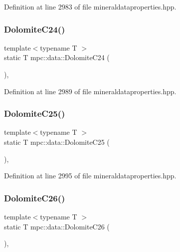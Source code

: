 Definition at line 2983 of file mineraldataproperties.\+hpp.

\mbox{\label{namespacempc_1_1data_a3535dc6953cb63a6ee50825e1d2cfbbd}} 
\subsubsection{\texorpdfstring{Dolomite\+C24()}{DolomiteC24()}}
{\footnotesize\ttfamily template$<$typename T $>$ \\
static T mpc\+::data\+::\+Dolomite\+C24 (\begin{DoxyParamCaption}{ }\end{DoxyParamCaption})\hspace{0.3cm}{\ttfamily [inline]}, {\ttfamily [static]}}



Definition at line 2989 of file mineraldataproperties.\+hpp.

\mbox{\label{namespacempc_1_1data_a7d251a476a8060a491588111c3f68ab3}} 
\subsubsection{\texorpdfstring{Dolomite\+C25()}{DolomiteC25()}}
{\footnotesize\ttfamily template$<$typename T $>$ \\
static T mpc\+::data\+::\+Dolomite\+C25 (\begin{DoxyParamCaption}{ }\end{DoxyParamCaption})\hspace{0.3cm}{\ttfamily [inline]}, {\ttfamily [static]}}



Definition at line 2995 of file mineraldataproperties.\+hpp.

\mbox{\label{namespacempc_1_1data_aa98a61022864565d891d7bfae59998d0}} 
\subsubsection{\texorpdfstring{Dolomite\+C26()}{DolomiteC26()}}
{\footnotesize\ttfamily template$<$typename T $>$ \\
static T mpc\+::data\+::\+Dolomite\+C26 (\begin{DoxyParamCaption}{ }\end{DoxyParamCaption})\hspace{0.3cm}{\ttfamily [inline]}, {\ttfamily [static]}}



